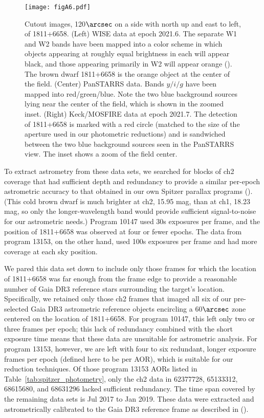 \documentclass[twocolumn,tighten,twocolappendix]{aastex631}
\begin{document}
\begin{figure*}
\texttt{[image: figA6.pdf]}
\caption{Cutout images, 120$\arcsec$ on a side with north up and east to left, of 1811+6658. (Left) WISE data at epoch 2021.6. The separate W1 and W2 bands have been mapped into a color scheme in which objects appearing at roughly equal brightness in each will appear black, and those appearing primarily in W2 will appear orange (\citealt{caselden2018}). The brown dwarf 1811+6658 is the orange object at the center of the field. (Center) PanSTARRS data. Bands $y/i/g$ have been mapped into red/green/blue. Note the two blue background sources lying near the center of the field, which is shown in the zoomed inset. (Right) Keck/MOSFIRE data at epoch 2021.7. The detection of 1811+6658 is marked with a red circle (matched to the size of the aperture used in our photometric reductions) and is sandwiched between the two blue background sources seen in the PanSTARRS view. The inset shows a zoom of the field center.
\label{fig:1811p6658_wiseview}}
\end{figure*}

To extract astrometry from these data sets, we searched for blocks of ch2 coverage that had sufficient depth and redundancy to provide a similar per-epoch astrometric accuracy to that obtained in our own Spitzer parallax programs (\citealt{kirkpatrick2019, kirkpatrick2021}). (This cold brown dwarf is much brighter at ch2, 15.95 mag, than at ch1, 18.23 mag, so only the longer-wavelength band would provide sufficient signal-to-noise for our astrometric needs.) Program 10147 used 30s exposures per frame, and the position of 1811+6658 was observed at four or fewer epochs. The data from program 13153, on the other hand, used 100s exposures per frame and had more coverage at each sky position.

We pared this data set down to include only those frames for which the location of 1811+6658 was far enough from the frame edge to provide a reasonable number of Gaia DR3 reference stars surrounding the target's location. Specifically, we retained only those ch2 frames that imaged all six of our pre-selected Gaia DR3 astrometric reference objects encircling a 60${\arcsec}$ zone centered on the location of 1811+6658. For program 10147, this left only two or three frames per epoch; this lack of redundancy combined with the short exposure time means that these data are unsuitable for astrometric analysis. For program 13153, however, we are left with four to six redundant, longer exposure frames per epoch (defined here to be per AOR), which is suitable for our reduction techniques. Of those program 13153 AORs listed in Table~\ref{tab:spitzer_photometry}, only the ch2 data in 62377728, 65133312, 68615680, and 68631296 lacked sufficient redundancy. The time span covered by the remaining data sets is Jul 2017 to Jan 2019. These data were extracted and astrometrically calibrated to the Gaia DR3 reference frame as described in (\citealt{kirkpatrick2021}).
\end{document}
